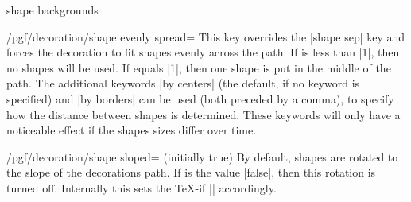 \begin{decoration}{shape backgrounds}
    \begin{key}{/pgf/decoration/shape evenly spread=}
        This key overrides the |shape sep| key and forces the decoration to fit
         shapes evenly across the path. If  is less
        than |1|, then no shapes will be used. If  equals |1|,
        then one shape is put in the middle of the path. The additional
        keywords |by centers| (the default, if no keyword is specified) and
        |by borders| can be used (both preceded by a comma), to specify how the
        distance between shapes is determined. These keywords will only have a
        noticeable effect if the shapes sizes differ over time.
\begin{codeexample}[]
\end{codeexample}
    \end{key}

    \begin{key}{/pgf/decoration/shape sloped= (initially true)}
        By default, shapes are rotated to the slope of the decorations path. If
         is the value |false|, then this rotation is turned off.
        Internally this sets the \TeX-if |\ifpgfshapedecorationsloped|
        accordingly.
\begin{codeexample}[preamble={\usetikzlibrary{shapes.geometric}}]
\end{codeexample}
    \end{key}


\end{decoration}
